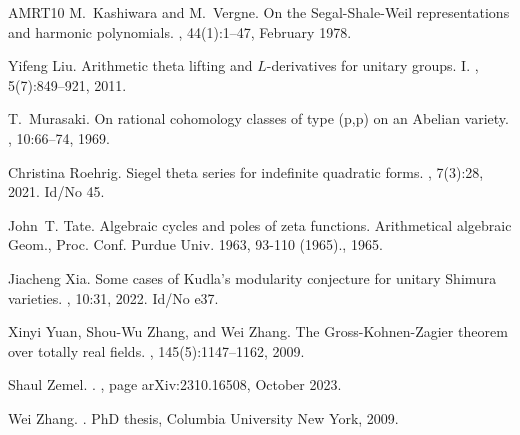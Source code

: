 \documentclass[11pt,letterpaper,english]{amsart}
\numberwithin{equation}{subsection}
\numberwithin{equation}{section}
\theoremstyle{plain}
\theoremstyle{remark}
\begin{document}
\begin{thebibliography}{AMRT10}
M.~Kashiwara and M.~Vergne.
\newblock On the {Segal}-{Shale}-{Weil} representations and harmonic
  polynomials.
, 44(1):1--47, February 1978.

Yifeng Liu.
\newblock Arithmetic theta lifting and {{\(L\)}}-derivatives for unitary
  groups. {I}.
, 5(7):849--921, 2011.

T.~Murasaki.
\newblock On rational cohomology classes of type (p,p) on an {Abelian} variety.
, 10:66--74, 1969.

Christina Roehrig.
\newblock Siegel theta series for indefinite quadratic forms.
, 7(3):28, 2021.
\newblock Id/No 45.

John~T. Tate.
\newblock Algebraic cycles and poles of zeta functions.
\newblock Arithmetical algebraic {Geom}., {Proc}. {Conf}. {Purdue} {Univ}.
  1963, 93-110 (1965)., 1965.

Jiacheng Xia.
\newblock Some cases of {Kudla}'s modularity conjecture for unitary {Shimura}
  varieties.
, 10:31, 2022.
\newblock Id/No e37.

Xinyi Yuan, Shou-Wu Zhang, and Wei Zhang.
\newblock The {Gross}-{Kohnen}-{Zagier} theorem over totally real fields.
, 145(5):1147--1162, 2009.

Shaul {Zemel}.
.
, page arXiv:2310.16508, October 2023.

Wei Zhang.
.
\newblock PhD thesis, Columbia University New York, 2009.

\end{thebibliography}
\end{document}

